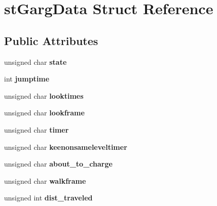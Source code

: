\hypertarget{structst_garg_data}{
\section{stGargData Struct Reference}
\label{structst_garg_data}
}
\subsection*{Public Attributes}
\begin{DoxyCompactItemize}
\item 
\hypertarget{structst_garg_data_a9aecd635eeee430eb052b358d7443de4}{
unsigned char {\bfseries state}}
\label{structst_garg_data_a9aecd635eeee430eb052b358d7443de4}

\item 
\hypertarget{structst_garg_data_a8e6b8a8cb3f64d88ce253533dc26c985}{
int {\bfseries jumptime}}
\label{structst_garg_data_a8e6b8a8cb3f64d88ce253533dc26c985}

\item 
\hypertarget{structst_garg_data_a6f2bb8c9374b1208e315e3cd599105d8}{
unsigned char {\bfseries looktimes}}
\label{structst_garg_data_a6f2bb8c9374b1208e315e3cd599105d8}

\item 
\hypertarget{structst_garg_data_a2b9b2b77fc9579fef31fca230ce9d477}{
unsigned char {\bfseries lookframe}}
\label{structst_garg_data_a2b9b2b77fc9579fef31fca230ce9d477}

\item 
\hypertarget{structst_garg_data_a74daf732a2a4f2d41d370dcb32231e66}{
unsigned char {\bfseries timer}}
\label{structst_garg_data_a74daf732a2a4f2d41d370dcb32231e66}

\item 
\hypertarget{structst_garg_data_a4fbf33a022a79d76ad5ccd9f8bfba540}{
unsigned char {\bfseries keenonsameleveltimer}}
\label{structst_garg_data_a4fbf33a022a79d76ad5ccd9f8bfba540}

\item 
\hypertarget{structst_garg_data_a4164d0bf67bfab0e53a4979441b725db}{
unsigned char {\bfseries about\_\-to\_\-charge}}
\label{structst_garg_data_a4164d0bf67bfab0e53a4979441b725db}

\item 
\hypertarget{structst_garg_data_ab03b48440c1823ae5507a95e07320b75}{
unsigned char {\bfseries walkframe}}
\label{structst_garg_data_ab03b48440c1823ae5507a95e07320b75}

\item 
\hypertarget{structst_garg_data_a3f7fe93a88bba3cd08241dc943b1e26f}{
unsigned int {\bfseries dist\_\-traveled}}
\label{structst_garg_data_a3f7fe93a88bba3cd08241dc943b1e26f}


\end{DoxyCompactItemize}
